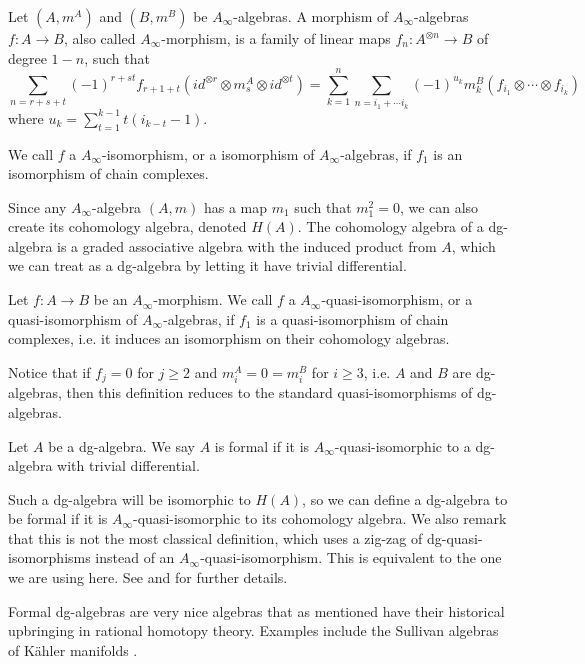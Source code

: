 \begin{definition}
    Let $(A, m^A)$ and $(B, m^B)$ be $A_\infty$-algebras. A morphism of 
    $A_\infty$-algebras $f:A\longrightarrow B$, also called $A_\infty$-morphism, is a 
    family of linear maps $f_n:A^{\otimes n}\longrightarrow B$ of degree $1-n$, such that
    $$\sum_{n = r+s+t}(-1)^{r+st}f_{r+1+t}(id^{\otimes r}\otimes m_s^A \otimes id^{\otimes t}) = \sum_{k=1}^{n}\sum_{n=i_1+\cdots i_k}(-1)^{u_k} m_k^B(f_{i_1}\otimes \cdots \otimes f_{i_k})$$
    where $u_k=\displaystyle \sum_{t=1}^{k-1}t(i_{k-t}-1)$.     
\end{definition}

We call $f$ a $A_\infty$-isomorphism, or a isomorphism of $A_\infty$-algebras, if $f_1$ 
is an isomorphism of chain complexes.

Since any $A_\infty$-algebra $(A, m)$ has a map $m_1$ such that $m_1^2=0$, we can also 
create its cohomology algebra, denoted $H(A)$. The cohomology algebra of a dg-algebra 
is a graded associative algebra with the induced product from $A$, which we can treat as 
a dg-algebra by letting it have trivial differential.

Let $f:A\longrightarrow B$ be an $A_\infty$-morphism. We call $f$ a 
$A_\infty$-quasi-isomorphism, or a quasi-isomorphism of $A_\infty$-algebras, if $f_1$ is 
a quasi-isomorphism of chain complexes, i.e. it induces an isomorphism on their cohomology 
algebras.

Notice that if $f_j=0$ for $j\geq 2$ and $m^A_i = 0 = m^B_i$ for $i\geq 3$, i.e. $A$ and 
$B$ are dg-algebras, then this definition reduces to the standard quasi-isomorphisms of 
dg-algebras.

\begin{definition}
    Let $A$ be a dg-algebra. We say $A$ is formal if it is 
    $A_\infty$-quasi-isomorphic to a dg-algebra with trivial differential.        
\end{definition}

Such a dg-algebra will be isomorphic to $H(A)$, so we can define a dg-algebra to be 
formal if it is $A_\infty$-quasi-isomorphic to its cohomology algebra. We also remark 
that this is not the most classical definition, which uses a zig-zag of 
dg-quasi-isomorphisms instead of an $A_\infty$-quasi-isomorphism. This is equivalent 
to the one we are using here. See \cite{AHO} and \cite{keller} for further details. 

Formal dg-algebras are very nice algebras that as mentioned have their historical 
upbringing in rational homotopy theory. Examples include the Sullivan algebras of 
Kähler manifolds \cite{DGMS}.